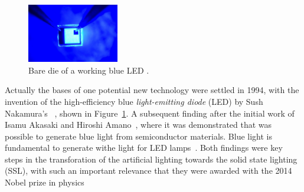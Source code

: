 \begin{figure}[!h]
\centering
\includegraphics[width=4cm]{./0_intro/img/10-7-14-nobel-prize-blue-led.jpg}
\caption{Bare die of a working blue LED  .}
\label{fig:blue_LED}
\end{figure}

Actually the bases of one potential new technology were settled  in 1994, with the invention of the high-efficiency blue \emph{light-emitting diode} (LED) by Sush Nakamura's ~\cite{94Nakamura}, shown in Figure~\ref{fig:blue_LED}. A subsequent finding after the initial work of Isamu Akasaki and Hiroshi Amano~\cite{94akasaki}, where it was  demonstrated that was possible to generate blue light from semiconductor materials. Blue light is fundamental to generate withe light for LED lamps~\cite{02narukawa}. Both findings were key steps in the transforation of the artificial lighting towards the solid state lighting (SSL), with such an important relevance that they were awarded with the 2014 Nobel prize in physics~\cite{14NobelPhy}

